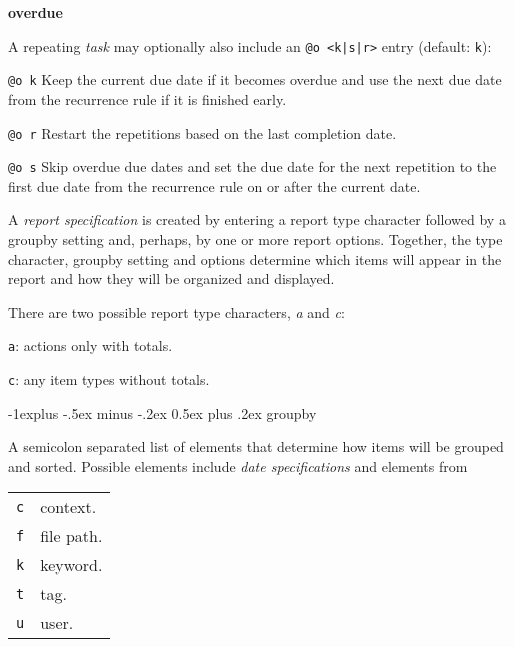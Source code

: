 \documentclass[9pt,landscape]{article}
\makeatletter
\renewcommand{\subsection}{\@startsection{subsection}{2}{0mm}%
                                {-1explus -.5ex minus -.2ex}%
                                {0.5ex plus .2ex}%
                                {\normalfont\normalsize\bfseries}}
\makeatother
\begin{document}
\begin{multicols}{3}
\textbf{overdue}

A repeating \emph{task} may optionally also include an \verb!@o <k|s|r>! entry (default: \verb'k'):

\begin{compactdesc}
   \item[\texttt{@o k}] Keep the current due date if it becomes overdue and use the next due date from the recurrence rule if it is finished early.
   \item[\texttt{@o r}] Restart the repetitions based on the last completion date.
   \item[\texttt{@o s}] Skip overdue due dates and set the due date for the next repetition to the first due date from the recurrence rule on or after the current date.
\end{compactdesc}


A \emph{report specification} is created by entering a report type character followed by a groupby setting and, perhaps, by one or more report options. Together, the type character, groupby setting and options determine which items will appear in the report and how they will be organized and displayed.

\vskip 3pt
There are two possible report type characters, \emph{a} and \emph{c}:

\begin{compactdesc}
\item[\texttt{a}:] actions only with totals.
\item[\texttt{c}:] any item types without totals.
\end{compactdesc}

\subsection{groupby}

A semicolon separated list of elements that determine how items will be grouped and sorted. Possible elements include \emph{date specifications} and elements from

\begin{tabular}{@{}ll@{}}
\texttt{c} & context. \\
\texttt{f} & file path. \\
\texttt{k} & keyword. \\
\texttt{t} & tag. \\
\texttt{u} & user. \\
\end{tabular}


\end{multicols}
\end{document}
